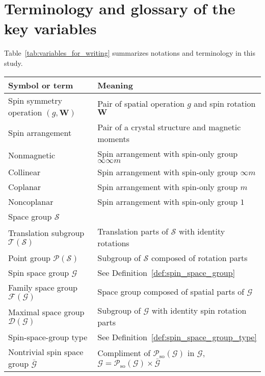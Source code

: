 \section{Terminology and glossary of the key variables}

Table~\ref{tab:variables_for_writing} summarizes notations and terminology in this study.

\begin{table*}[tb]
    \centering
    \caption{Notation and terminology}
    \label{tab:variables_for_writing}
    \begin{tabular}{ll}
        \hline\hline
        Symbol or term & Meaning \\ \hline
        Spin symmetry operation $(g, \bm{W})$ & Pair of spatial operation $g$ and spin rotation $\bm{W}$ \\
        \hline
        Spin arrangement & Pair of a crystal structure and magnetic moments \\
        Nonmagnetic & Spin arrangement with spin-only group $\infty \infty m$ \\
        Collinear & Spin arrangement with spin-only group $\infty m$ \\
        Coplanar & Spin arrangement with spin-only group $m$ \\
        Noncoplanar & Spin arrangement with spin-only group $1$ \\
        \hline
        Space group $\mathcal{S}$ & \\
        Translation subgroup $\mathcal{T}(\mathcal{S})$ & Translation parts of $\mathcal{S}$ with identity rotations \\
        Point group $\mathcal{P}(\mathcal{S})$ & Subgroup of $\mathcal{S}$ composed of rotation parts \\
        \hline
        Spin space group $\mathcal{G}$ & See Definition~\ref{def:spin_space_group} \\
        Family space group $\mathcal{F}(\mathcal{G})$ & Space group composed of spatial parts of $\mathcal{G}$ \\
        Maximal space group $\mathcal{D}(\mathcal{G})$ & Subgroup of $\mathcal{G}$ with identity spin rotation parts \\
        Spin-space-group type & See Definition~\ref{def:spin_space_group_type} \\
        Nontrivial spin space group $\bar{\mathcal{G}}$ & Compliment of $\mathcal{P}_{\mathrm{so}}(\mathcal{G})$ in $\mathcal{G}$, $\mathcal{G} = \mathcal{P}_{\mathrm{so}}(\mathcal{G}) \times \bar{\mathcal{G}}$ \\

\end{tabular}
\end{table*}
